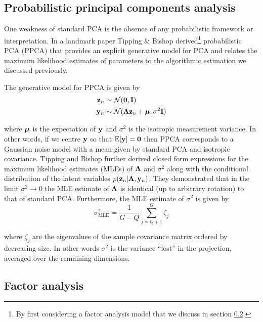 \subsection{Probabilistic principal components analysis}

One weakness of standard PCA is the absence of any probabilistic framework or interpretation. In a landmark paper \cite{tipping1999probabilistic} Tipping \& Bishop derived\footnote{By first considering a factor analysis model that we discuss in section \ref{sec:intr:fa}.} probabilistic PCA (PPCA) that provides an explicit generative model for PCA and relates the maximum likelihood estimates of parameters to the algorithmic estimation we discussed previously.

The generative model for PPCA is given by
\begin{equation}
  \begin{aligned}
    \mathbf{z}_n & \sim \mathcal{N}(\bm{0}, \mathbf{I}) \\
    \mathbf{y}_n & \sim \mathcal{N}(\bm{\Lambda} \mathbf{z}_n + \bm{\mu}, \sigma^2 \mathbf{I})
  \end{aligned}
\end{equation}

where $\bm{\mu}$ is the expectation of $\mathbf{y}$ and $\sigma^2$ is the isotropic measurement variance. In other words, if we centre $\mathbf{y}$ so that $\text{E}[\mathbf{y}] = \bm{0}$ then PPCA corresponds to a Gaussian noise model with a mean given by standard PCA and isotropic covariance. Tipping and Bishop further derived closed form expressions for the maximum likelihood estimates (MLEs) of $\bm{\Lambda}$ and $\sigma^2$ along with the conditional distribution of the latent variables $p(\mathbf{z}_n | \bm{\Lambda}, \mathbf{y}_n)$. They demonstrated that in the limit $\sigma^2 \rightarrow 0$ the MLE estimate of $\bm{\Lambda}$ is identical (up to arbitrary rotation) to that of standard PCA. Furthermore, the MLE estimate of $\sigma^2$ is given by
\begin{equation}
  \sigma^2_{\text{MLE}} = \frac{1}{G-Q} \sum_{j = Q + 1}^G \zeta_j
\end{equation}

where $\zeta_j$ are the eigenvalues of the sample covariance matrix ordered by decreasing size. In other words $\sigma^2$ is the variance ``lost'' in the projection, averaged over the remaining dimensions.

\subsection{Factor analysis} \label{sec:intr:fa}

